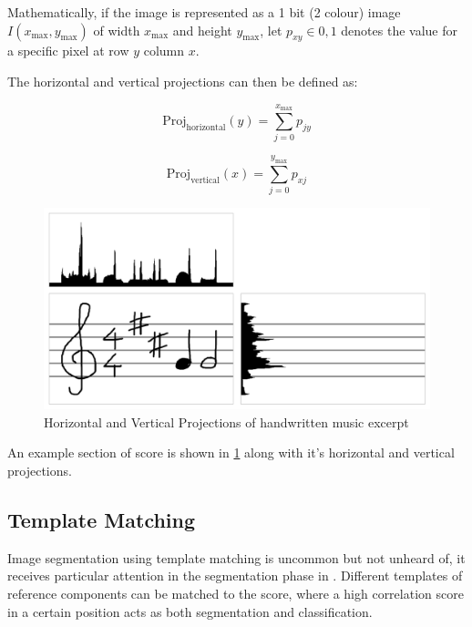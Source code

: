 Mathematically, if the image is represented as a 1 bit (2 colour) image $I(x_{\text{max}}, y_{\text{max}})$ of width $x_{\text{max}}$ and height $y_{\text{max}}$, let $p_{xy} \in 0, 1$ denotes the value for a specific pixel at row $y$ column $x$.

The horizontal and vertical projections can then be defined as:


\begin{equation} \label{eq:hproj}
  \text{Proj}_{\text{horizontal}}(y) = \sum_{j = 0}^{x_\text{max}} p_{jy}
\end{equation}

\begin{equation} \label{eq:vproj}
  \text{Proj}_{\text{vertical}}(x) = \sum_{j = 0}^{y_\text{max}} p_{xj}
\end{equation}

\begin{figure}[h!]
  \centering
  \includegraphics[width=\linewidth]{gfx/background-omr/projection.png}
  \caption{Horizontal and Vertical Projections of handwritten music excerpt}
  \label{fig:stave-projection}
\end{figure}

An example section of score is shown in \cref{fig:stave-projection} along with it's horizontal and vertical projections.


\subsection{Template Matching}

Image segmentation using template matching is uncommon but not unheard of, it receives particular attention in the segmentation phase in \cite{rossant2002global}. Different templates of reference components can be matched to the score, where a high correlation score in a certain position acts as both segmentation and classification.

